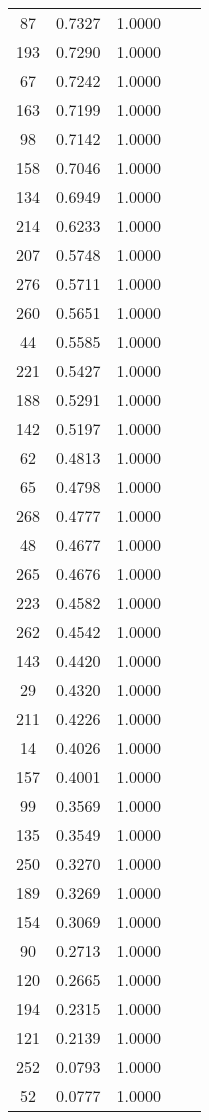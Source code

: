 \documentclass[12pt]{article}\usepackage[]{graphicx}\usepackage[]{color}
\begin{document}
\begin{longtable}[c]{ccccc}
	87	& 0.7327 & 1.0000 & & \\
	193	& 0.7290 & 1.0000 & & \\
	67	& 0.7242 & 1.0000 & & \\
	163	& 0.7199 & 1.0000 & & \\
	98	& 0.7142 & 1.0000 & & \\
	158	& 0.7046 & 1.0000 & & \\
	134	& 0.6949 & 1.0000 & & \\
	214	& 0.6233 & 1.0000 & & \\
	207	& 0.5748 & 1.0000 & & \\
	276	& 0.5711 & 1.0000 & & \\
	260	& 0.5651 & 1.0000 & & \\
	44	& 0.5585 & 1.0000 & & \\
	221	& 0.5427 & 1.0000 & & \\
	188	& 0.5291 & 1.0000 & & \\
	142	& 0.5197 & 1.0000 & & \\
	62	& 0.4813 & 1.0000 & & \\
	65	& 0.4798 & 1.0000 & & \\
	268	& 0.4777 & 1.0000 & & \\
	48	& 0.4677 & 1.0000 & & \\
	265	& 0.4676 & 1.0000 & & \\
	223	& 0.4582 & 1.0000 & & \\
	262	& 0.4542 & 1.0000 & & \\
	143	& 0.4420 & 1.0000 & & \\
	29	& 0.4320 & 1.0000 & & \\
	211	& 0.4226 & 1.0000 & & \\
	14	& 0.4026 & 1.0000 & & \\
	157	& 0.4001 & 1.0000 & & \\
	99	& 0.3569 & 1.0000 & & \\
	135	& 0.3549 & 1.0000 & & \\
	250	& 0.3270 & 1.0000 & & \\
	189	& 0.3269 & 1.0000 & & \\
	154	& 0.3069 & 1.0000 & & \\
	90	& 0.2713 & 1.0000 & & \\
	120	& 0.2665 & 1.0000 & & \\
	194	& 0.2315 & 1.0000 & & \\
	121	& 0.2139 & 1.0000 & & \\
	252	& 0.0793 & 1.0000 & & \\
	52	& 0.0777 & 1.0000 & & \\

\end{longtable}
\end{document}
